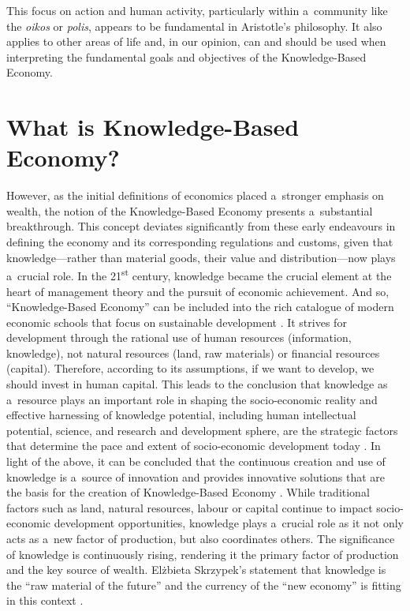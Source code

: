 This focus on action and human activity, particularly within a~community like the \textit{oikos} or \textit{polis}, appears to be fundamental in Aristotle's philosophy. It also applies to other areas of life and, in our opinion, can and should be used when interpreting the fundamental goals and objectives of the Knowledge-Based Economy.



\section{What is Knowledge-Based Economy?}

However, as the initial definitions of economics placed a~stronger emphasis on wealth, the notion of the Knowledge-Based Economy presents a~substantial breakthrough. This concept deviates significantly from these early endeavours in defining the economy and its corresponding regulations and customs, given that knowledge---rather than material goods, their value and distribution---now plays a~crucial role. In the 21\textsuperscript{st} century, knowledge became the crucial element at the heart of management theory and the pursuit of economic achievement. And so, ``Knowledge-Based Economy'' can be included into the rich catalogue of modern economic schools that focus on sustainable development 
\parencites[e.g.,][]{rogall_ekonomia_2010}[][]{shmelev_ecological_2012}[][]{raworth_doughnut_2017}[][]{govender_rise_2021}. %
 It strives for development through the rational use of human resources (information, knowledge), not natural resources (land, raw materials) or financial resources (capital). Therefore, according to its assumptions, if we want to develop, we should invest in human capital. This leads to the conclusion that knowledge as a~resource plays an important role in shaping the socio-economic reality and effective harnessing of knowledge potential, including human intellectual potential, science, and research and development sphere, are the strategic factors that determine the pace and extent of socio-economic development today 
\parencite[][p.193]{skrzypek_gow_2012}. %
 In light of the above, it can be concluded that the continuous creation and use of knowledge is a~source of innovation and provides innovative solutions that are the basis for the creation of Knowledge-Based Economy 
\parencite[][p.15]{zienkowski_gospodarka_2003}. %
 While traditional factors such as land, natural resources, labour or capital continue to impact socio-economic development opportunities, knowledge plays a~crucial role as it not only acts as a~new factor of production, but also coordinates others. The significance of knowledge is continuously rising, rendering it the primary factor of production and the key source of wealth. Elżbieta Skrzypek's statement that knowledge is the ``raw material of the future'' and the currency of the ``new economy'' is fitting in this context 
\parencite[][p.20]{skrzypek_gow_2018}.%




